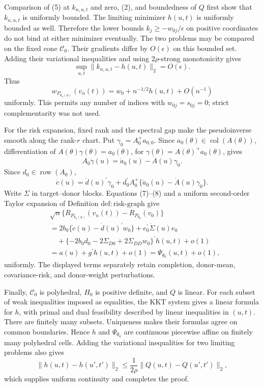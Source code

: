 Comparison of (5) at \(k_{n,u,t}\) and zero, (2), and boundedness of \(Q\) first show that \(k_{n,u,t}\) is uniformly bounded.  The limiting minimizer \(h(u,t)\) is uniformly bounded as well.  Therefore the lower bounds \(k_j\geq-w_{0j}/\epsilon\) on positive coordinates do not bind at either minimizer eventually.  The two problems may be compared on the fixed cone \(\mathcal C_0\).  Their gradients differ by \(O(\epsilon)\) on this bounded set.  Adding their variational inequalities and using \(2\rho\)-strong monotonicity gives
\[
 \sup_{u,t}\lVert k_{n,u,t}-h(u,t)\rVert_2=O(\epsilon).
\tag{6}
\]
Thus
\[
 w_{P_{\theta_n(u)}}(v_n(t))
 =w_0+n^{-1/2}h(u,t)+O(n^{-1})
\tag{7}
\]
uniformly.  This permits any number of indices with \(w_{0j}=s_{0j}=0\); strict complementarity was not used.

For the risk expansion, fixed rank and the spectral gap make the pseudoinverse smooth along the rank-\(r\) chart.  Put \(\gamma_0=A_0^+a_{0,0}\).  Since \(a_0(\theta)\in\operatorname{col}(A(\theta))\), differentiation of \(A(\theta)\gamma(\theta)=a_0(\theta)\), for \(\gamma(\theta)=A(\theta)^+a_0(\theta)\), gives
\[
 A_0\dot\gamma(u)=\dot a_0(u)-\dot A(u)\gamma_0.
\]
Since \(d_0\in\operatorname{row}(A_0)\),
\[
 \dot c(u)
 =\dot d(u)^\prime\gamma_0
 +d_0^\prime A_0^+
   \{\dot a_0(u)-\dot A(u)\gamma_0\}.
\tag{8}
\]
Write \(\Sigma\) in target--donor blocks.  Equations (7)--(8) and a uniform second-order Taylor expansion of Definition \(\mathrm{def:risk\mbox{-}graph}\) give
\[
\begin{aligned}
 &\sqrt n\{R_{P_{\theta_n(u)}}(v_n(t))-R_{P_{\theta_0}}(v_0)\}\\
 &=
 2b_0\{\dot c(u)-\dot d(u)^\prime w_0\}
 +e_0^\prime\dot\Sigma(u)e_0\\
 &\quad
 +\{-2b_0d_0-2\Sigma_{D0}+2\Sigma_{DD}w_0\}^\prime h(u,t)
 +o(1)\\
 &=a(u)+g^\prime h(u,t)+o(1)
 =\Psi_{\theta_0}(u,t)+o(1),
\end{aligned}
\tag{9}
\]
uniformly.  The displayed terms separately retain completion, donor-mean, covariance-risk, and donor-weight perturbations.

Finally, \(\mathcal C_0\) is polyhedral, \(H_0\) is positive definite, and \(Q\) is linear.  For each subset of weak inequalities imposed as equalities, the KKT system gives a linear formula for \(h\), with primal and dual feasibility described by linear inequalities in \((u,t)\).  There are finitely many subsets.  Uniqueness makes their formulas agree on common boundaries.  Hence \(h\) and \(\Psi_{\theta_0}\) are continuous piecewise affine on finitely many polyhedral cells.  Adding the variational inequalities for two limiting problems also gives
\[
 \lVert h(u,t)-h(u',t')\rVert_2
 \leq \frac{1}{2\rho}
 \lVert Q(u,t)-Q(u',t')\rVert_2,
\]
which supplies uniform continuity and completes the proof.

